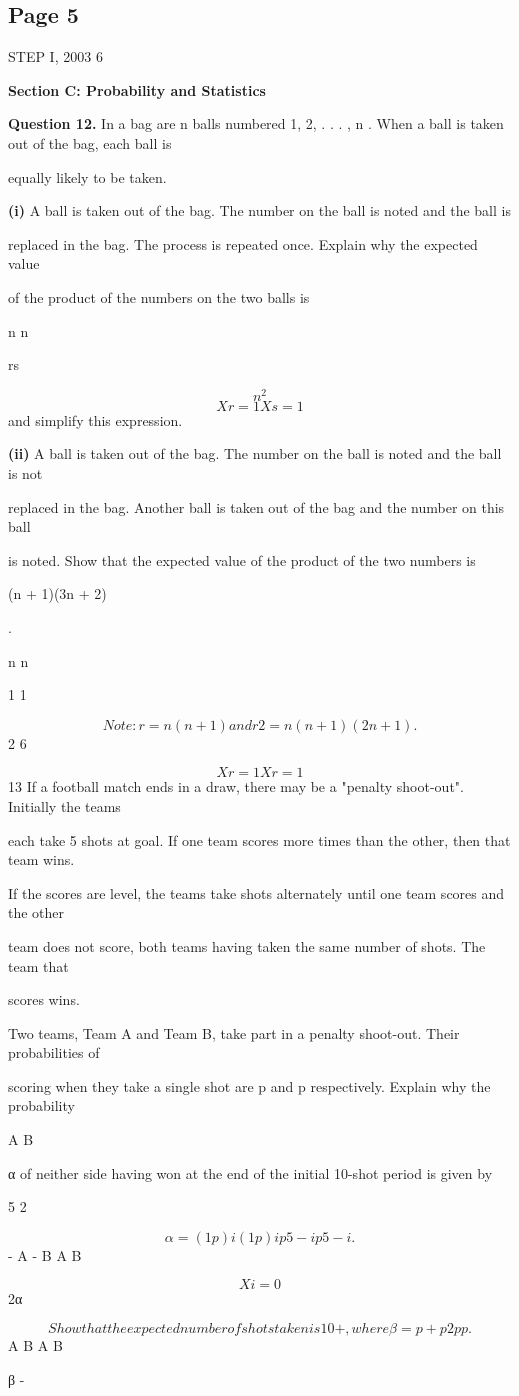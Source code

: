 \documentclass[12pt]{article}
\begin{document}
\subsection*{Page 5}
\begin{flushleft}
STEP I, 2003 6\par
\bigskip\textbf{Section C: Probability and Statistics}\par
\bigskip\textbf{Question 12.} In a bag are n balls numbered 1, 2, . . . , n . When a ball is taken out of the bag, each ball is\par
equally likely to be taken.\par
\textbf{(i)} A ball is taken out of the bag. The number on the ball is noted and the ball is\par
replaced in the bag. The process is repeated once. Explain why the expected value\par
of the product of the numbers on the two balls is\par
n n\par
rs\par
\[n^2\]
\[Xr=1 Xs=1\]
and simplify this expression.\par
\textbf{(ii)} A ball is taken out of the bag. The number on the ball is noted and the ball is not\par
replaced in the bag. Another ball is taken out of the bag and the number on this ball\par
is noted. Show that the expected value of the product of the two numbers is\par
(n + 1)(3n + 2)\par
.\par
n n\par
1 1\par
\[Note: r = n(n + 1) and r 2 = n(n + 1)(2n + 1) .\]
2 6\par
\[Xr=1 Xr=1\]
13 If a football match ends in a draw, there may be a "penalty shoot-out". Initially the teams\par
each take 5 shots at goal. If one team scores more times than the other, then that team wins.\par
If the scores are level, the teams take shots alternately until one team scores and the other\par
team does not score, both teams having taken the same number of shots. The team that\par
scores wins.\par
Two teams, Team A and Team B, take part in a penalty shoot-out. Their probabilities of\par
scoring when they take a single shot are p and p respectively. Explain why the probability\par
A B\par
α of neither side having won at the end of the initial 10-shot period is given by\par
5 2\par
\[α = (1 p )i(1 p )i p 5-ip 5-i.\]
\lambdai\mu - A - B A B\par
\[Xi=0\]
2α\par
\[Show that the expected number of shots taken is 10 + , where β = p + p 2p p .\]
A B A B\par
β -\par
\end{flushleft}
\end{document}
